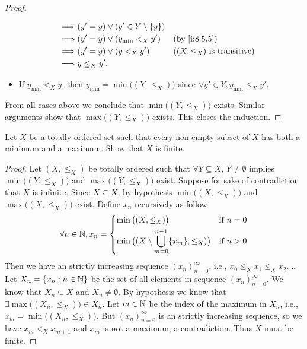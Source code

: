 \begin{proof}
\begin{itemize}
\begin{align*}
            \implies & (y' = y) \lor (y' \in Y \setminus \set{y})                                             \\
            \implies & (y' = y) \lor (y_{\min} <_X y')            &  & \by{i:8.5.5}                           \\
            \implies & (y' = y) \lor (y <_X y')                   &  & \text{(\((X, \leq_X)\) is transitive)} \\
            \implies & y \leq_X y'.
          \end{align*}
    \item If \(y_{\min} <_X y\), then \(y_{\min} = \min\big((Y, \leq_X)\big)\) since \(\forall y' \in Y, y_{\min} \leq_X y'\).
  \end{itemize}
  From all cases above we conclude that \(\min\big((Y, \leq_X)\big)\) exists.
  Similar arguments show that \(\max\big((Y, \leq_X)\big)\) exists.
  This closes the induction.
\end{proof}

\begin{ex}\label{i:ex:8.5.9}
  Let \(X\) be a totally ordered set such that every non-empty subset of \(X\) has both a minimum and a maximum.
  Show that \(X\) is finite.
\end{ex}

\begin{proof}
  Let \((X, \leq_X)\) be totally ordered such that \(\forall Y \subseteq X\), \(Y \neq \emptyset\) implies \(\min\big((Y, \leq_X)\big)\) and \(\max\big((Y, \leq_X)\big)\) exist.
  Suppose for sake of contradiction that \(X\) is infinite.
  Since \(X \subseteq X\), by hypothesis \(\min\big((X, \leq_X)\big)\) and \(\max\big((X, \leq_X)\big)\) exist.
  Define \(x_n\) recursively as follow
  \[
    \forall n \in \N, x_n = \begin{dcases}
      \min\big((X, \leq_X)\big)                                             & \text{if } n = 0 \\
      \min\big((X \setminus \bigcup_{m = 0}^{n - 1} \set{x_m}, \leq_X)\big) & \text{if } n > 0
    \end{dcases}
  \]
  Then we have an strictly increasing sequence \((x_n)_{n = 0}^\infty\), i.e., \(x_0 \leq_X x_1 \leq_X x_2 \dots\).
  Let \(X_n = \left\lbrace x_n : n \in \mathbb{N}\right\rbrace\) be the set of all elements in sequence \((x_n)_{n = 0}^\infty\).
  We know that \(X_n \subseteq X\) and \(X_n \neq \emptyset\).
  By hypothesis we know that \(\exists \max\big((X_n, \leq_X)\big) \in X_n\).
  Let \(m \in \mathbb{N}\) be the index of the maximum in \(X_n\), i.e., \(x_m = \min\big((X_n, \leq_X)\big)\).
  But \((x_n)_{n = 0}^\infty\) is an strictly increasing sequence, so we have \(x_m <_X x_{m + 1}\) and \(x_m\) is not a maximum, a contradiction.
  Thus \(X\) must be finite.
\end{proof}

